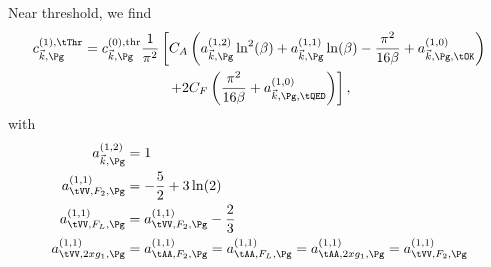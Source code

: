 Near threshold, we find
\begin{align}
c_{\vec k,\Pg}^{(1),\tThr} &= c_{\vec k,\Pg}^{(0),\text{thr}} \frac{1}{\pi^2}\left[
     C_A\left(a_{\vec k,\Pg}^{(1,2)}\ln^2(\beta) + a_{\vec k,\Pg}^{(1,1)}\ln(\beta) - \frac{\pi^2}{16\beta} + a_{\vec k,\Pg,\tOK}^{(1,0)}\right) \right. \nonumber\\
 &\hspace{60pt} \left. + 2C_F\left(\frac{\pi^2}{16\beta} + a_{\vec k,\Pg,\tQED}^{(1,0)}\right)\right],
\end{align}
with
\begin{align}
a^{(1,2)}_{\vec k,\Pg} &= 1\\
a^{(1,1)}_{\tVV,F_2,\Pg} &= -\frac 5 2 + 3\ln(2)\\
a^{(1,1)}_{\tVV,F_L,\Pg} &= a^{(1,1)}_{\tVV,F_2,\Pg} - \frac 2 3\\
a^{(1,1)}_{\tVV,2xg_1,\Pg} &= a^{(1,1)}_{\tAA,F_2,\Pg} = a^{(1,1)}_{\tAA,F_L,\Pg} = a^{(1,1)}_{\tAA,2xg_1,\Pg}= a^{(1,1)}_{\tVV,F_2,\Pg}
\end{align}


